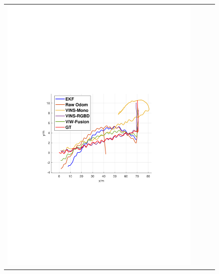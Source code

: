 \documentclass[conference]{IEEEtran}
\begin{document}
\begin{figure}
\begin{center}
\begin{tabular}{cccc}
				\includegraphics[scale=0.26]{fig/corridor1.pdf} &

\end{tabular}
\end{center}
\end{figure}
\end{document}
